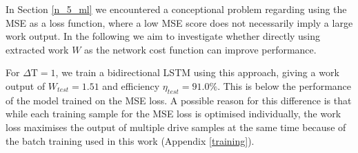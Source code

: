 In Section \ref{n_5_ml} we encountered a conceptional problem regarding using the MSE as a loss function, where a low MSE score does not necessarily imply a large work output.
In the following we aim to investigate whether directly using extracted work $W$ as the network cost function can improve performance.

For $\Delta \mathrm{T} = 1$, we train a bidirectional LSTM using this approach, giving a work output of $W_{test} = 1.51$ and efficiency $\eta_{test} = 91.0 \%$.
This is below the performance of the model trained on the MSE loss.
A possible reason for this difference is that while each training sample for the MSE loss is optimised individually, the work loss maximises the output of multiple drive samples at the same time because of the batch training used in this work (Appendix \ref{training}).

